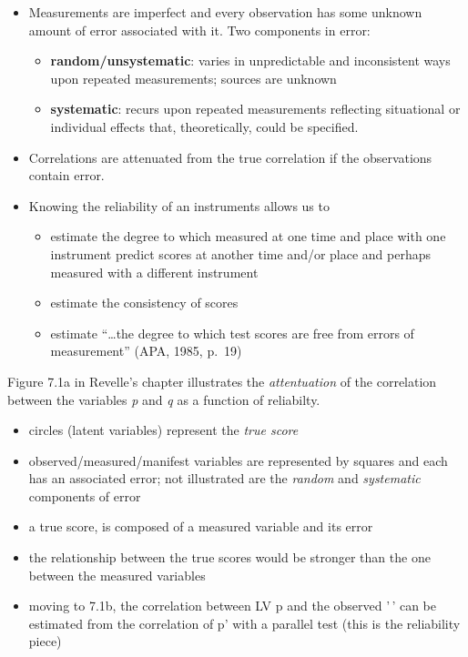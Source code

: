 \documentclass[
  english,
]{book}
\providecommand{\tightlist}{%
  \setlength{\itemsep}{0pt}\setlength{\parskip}{0pt}}
\begin{document}
\begin{itemize}
\tightlist
\item
  Measurements are imperfect and every observation has some unknown amount of error associated with it. Two components in error:

  \begin{itemize}
  \tightlist
  \item
    \textbf{random/unsystematic}: varies in unpredictable and inconsistent ways upon repeated measurements; sources are unknown
  \item
    \textbf{systematic}: recurs upon repeated measurements reflecting situational or individual effects that, theoretically, could be specified.
  \end{itemize}
\item
  Correlations are attenuated from the true correlation if the observations contain error.
\item
  Knowing the reliability of an instruments allows us to

  \begin{itemize}
  \tightlist
  \item
    estimate the degree to which measured at one time and place with one instrument predict scores at another time and/or place and perhaps measured with a different instrument
  \item
    estimate the consistency of scores
  \item
    estimate ``\ldots the degree to which test scores are free from errors of measurement'' (APA, 1985, p.~19)
  \end{itemize}
\end{itemize}

Figure 7.1a in Revelle's chapter illustrates the \emph{attentuation} of the correlation between the variables \emph{p} and \emph{q} as a function of reliabilty.

\begin{itemize}
\tightlist
\item
  circles (latent variables) represent the \emph{true score}
\item
  observed/measured/manifest variables are represented by squares and each has an associated error; not illustrated are the \emph{random} and \emph{systematic} components of error
\item
  a true score, is composed of a measured variable and its error
\item
  the relationship between the true scores would be stronger than the one between the measured variables
\item
  moving to 7.1b, the correlation between LV p and the observed '\,' can be estimated from the correlation of p' with a parallel test (this is the reliability piece)
\end{itemize}
\end{document}
